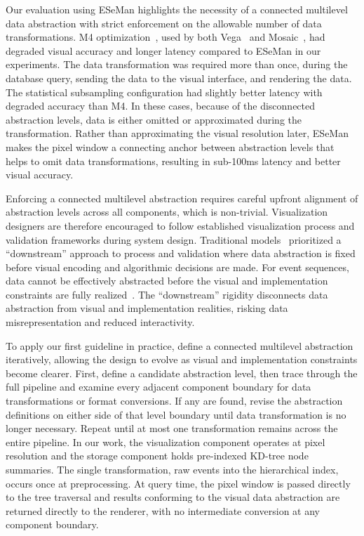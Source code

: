 \begin{refsection}
Our evaluation using ESeMan highlights the necessity of a connected multilevel data abstraction with strict enforcement on the allowable number of data transformations. M4 optimization~\cite{jugel2014m4}, used by both Vega~\cite{kruchten2022vegafusion} and Mosaic~\cite{heer2023mosaic}, had degraded visual accuracy and longer latency compared to ESeMan in our experiments. The data transformation was required more than once, during the database query, sending the data to the visual interface, and rendering the data. The statistical subsampling configuration had slightly better latency with degraded accuracy than M4. In these cases, because of the disconnected abstraction levels, data is either omitted or approximated during the transformation. Rather than approximating the visual resolution later, ESeMan makes the pixel window a connecting anchor between abstraction levels that helps to omit data transformations, resulting in sub-100ms latency and better visual accuracy.

Enforcing a connected multilevel abstraction requires careful upfront alignment of abstraction levels across all components, which is non-trivial. Visualization designers are therefore encouraged to follow established visualization process and validation frameworks during system design. Traditional models~\cite{munzner2009nested, meyer2015nested} prioritized a ``downstream'' approach to process and validation where data abstraction is fixed before visual encoding and algorithmic decisions are made. For event sequences, data cannot be effectively abstracted before the visual and implementation constraints are fully realized~\cite{zinat2023comparative}. The ``downstream'' rigidity disconnects data abstraction from visual and implementation realities, risking data misrepresentation and reduced interactivity. 

To apply our first guideline in practice, define a connected multilevel abstraction iteratively, allowing the design to evolve as visual and implementation constraints become clearer. First, define a candidate abstraction level, then trace through the full pipeline and examine every adjacent component boundary for data transformations or format conversions. If any are found, revise the abstraction definitions on either side of that level boundary until data transformation is no longer necessary. Repeat until at most one transformation remains across the entire pipeline. In our work, the visualization component operates at pixel resolution and the storage component holds pre-indexed KD-tree node summaries. The single transformation, raw events into the hierarchical index, occurs once at preprocessing. At query time, the pixel window is passed directly to the tree traversal and results conforming to the visual data abstraction are returned directly to the renderer, with no intermediate conversion at any component boundary.


\end{refsection}
